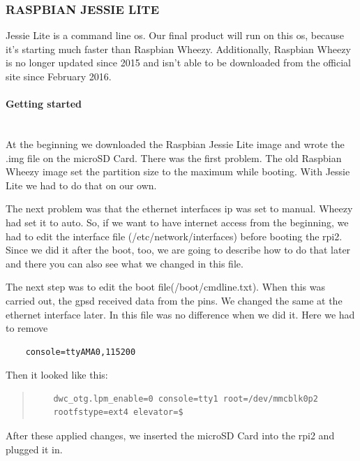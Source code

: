 \subsubsection{RASPBIAN JESSIE LITE}
Jessie Lite is a command line \gls{os}. Our final product will run on this \gls{os}, because it's starting much faster than Raspbian Wheezy. Additionally, Raspbian Wheezy is no longer updated since 2015 and isn't able to be downloaded from the official site since February 2016.
\paragraph{Getting started} \mbox{}\\
At the beginning we downloaded the Raspbian Jessie Lite image and wrote the .img file on the microSD Card. There was the first problem. The old Raspbian Wheezy image set the partition size to the maximum while booting. With Jessie Lite we had to do that on our own. 

The next problem was that the ethernet interfaces \gls{ip} was set to manual. Wheezy had set it to auto. So, if we want to have internet access from the beginning, we had to edit the interface file (/etc/network/interfaces) before booting the \gls{rpi2}. Since we did it after the boot, too, we are going to describe how to do that later and there you can also see what we changed in this file.

The next step was to edit the boot file(/boot/cmdline.txt). When this was carried out, the \gls{gpsd} received data from the pins. We changed the same at the ethernet interface later. In this file was no difference when we did it. 
\newline \newline
Here we had to remove 
\begin{verbatim}
	console=ttyAMA0,115200
\end{verbatim}
Then it looked like this: 
\begin{quote}
\begin{verbatim}
	dwc_otg.lpm_enable=0 console=tty1 root=/dev/mmcblk0p2 
	rootfstype=ext4 elevator=$
\end{verbatim}
\end{quote}
After these applied changes, we inserted the microSD Card into the \gls{rpi2} and plugged it in.
